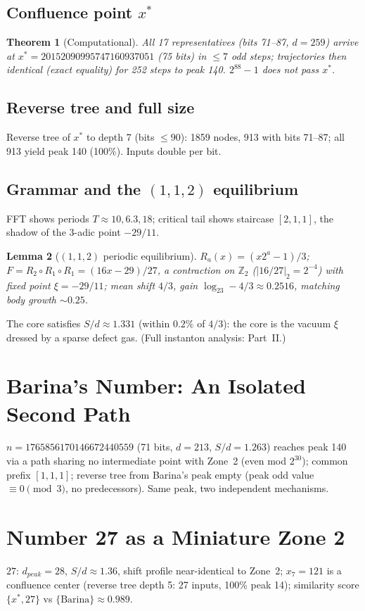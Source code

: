 \documentclass[12pt,a4paper]{article}
\newtheorem{theorem}{Theorem}
\newtheorem{lemma}[theorem]{Lemma}
\theoremstyle{remark}
\begin{document}
\subsection{Confluence point $x^*$}
\begin{theorem}[Computational]
All 17 representatives (bits 71--87, $d=259$) arrive at
$x^*=20152090995747160937051$ (75 bits) in $\le7$ odd steps; trajectories then
identical (exact equality) for 252 steps to peak 140. $2^{88}-1$ does not pass $x^*$.
\end{theorem}
\subsection{Reverse tree and full size}
Reverse tree of $x^*$ to depth 7 (bits $\le90$): 1859 nodes, 913 with bits
71--87; all 913 yield peak 140 (100\%). Inputs double per bit.
\subsection{Grammar and the $(1,1,2)$ equilibrium}
FFT shows periods $T\approx10,6.3,18$; critical tail shows staircase $[2,1,1]$,
the shadow of the $3$-adic point $-29/11$.
\begin{lemma}[$(1,1,2)$ periodic equilibrium]
$R_a(x)=(x2^a-1)/3$; $F=R_2\circ R_1\circ R_1=(16x-29)/27$, a contraction on
$\mathbb Z_2$ ($|16/27|_2=2^{-4}$) with fixed point $\xi=-29/11$; mean shift
$4/3$, gain $\log_23-4/3\approx0.2516$, matching body growth $\sim0.25$.
\end{lemma}
The core satisfies $S/d\approx1.331$ (within $0.2\%$ of $4/3$): the core is the
vacuum $\xi$ dressed by a sparse defect gas. (Full instanton analysis: Part~II.)

\section{Barina's Number: An Isolated Second Path}
$n=1765856170146672440559$ (71 bits, $d=213$, $S/d=1.263$) reaches peak 140 via
a path sharing no intermediate point with Zone~2 (even mod $2^{30}$); common
prefix $[1,1,1]$; reverse tree from Barina's peak empty (peak odd value
$\equiv0\pmod3$, no predecessors). Same peak, two independent mechanisms.

\section{Number 27 as a Miniature Zone 2}
$27$: $d_{peak}=28$, $S/d\approx1.36$, shift profile near-identical to Zone~2;
$x_7=121$ is a confluence center (reverse tree depth 5: 27 inputs, 100\% peak 14);
similarity score $\{x^*,27\}$ vs $\{\text{Barina}\}\approx0.989$.
\end{document}
